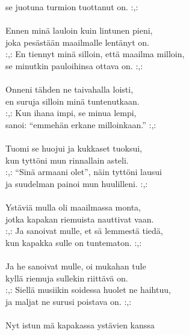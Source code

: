             se juotuna turmion tuottanut on. :,: \\
\hspace{10mm} \\
            Ennen minä lauloin kuin lintunen pieni, \\
            joka pesästään maailmalle lentänyt on. \\
            :,: En tiennyt minä silloin, että maailma milloin, \\
            se minutkin pauloihinsa ottava on. :,: \\
\hspace{10mm} \\
            Onneni tähden ne taivahalla loisti, \\
            en suruja silloin minä tuntenutkaan. \\
            :,: Kun ihana impi, se minua lempi, \\
            sanoi: “emmehän erkane milloinkaan.” :,: \\
\hspace{10mm} \\
            Tuomi se huojui ja kukkaset tuoksui, \\
            kun tyttöni mun rinnallain asteli. \\
            :,: “Sinä armaani olet”, näin tyttöni lausui \\
            ja suudelman painoi mun huulilleni. :,: \\
\hspace{10mm} \\
            Ystäviä mulla oli maailmassa monta, \\
            jotka kapakan riemuista nauttivat vaan. \\
            :,: Ja sanoivat mulle, et sä lemmestä tiedä, \\
            kun kapakka sulle on tuntematon. :,: \\
\hspace{10mm} \\
            Ja he sanoivat mulle, oi mukahan tule \\
            kyllä riemuja sullekin riittävä on. \\
            :,: Siellä musiikin soidessa huolet ne haihtuu, \\
            ja maljat ne surusi poistava on. :,: \\
\hspace{10mm} \\
            Nyt istun mä kapakassa ystävien kanssa \\
